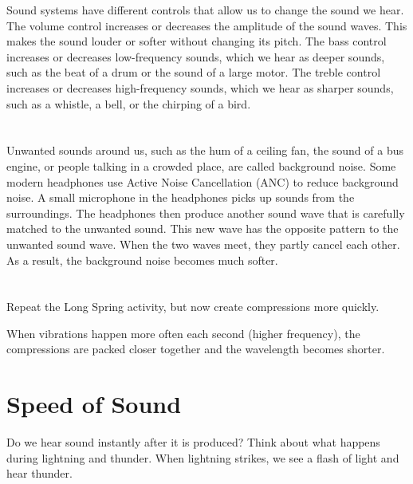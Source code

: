 \documentclass{xtufte-handout}
\begin{document}
Sound systems have different controls that allow us to change the sound we hear. The volume control increases or decreases the amplitude of the sound waves. This makes the sound louder or softer without changing its pitch. The bass control increases or decreases low-frequency sounds, which we hear as deeper sounds, such as the beat of a drum or the sound of a large motor. The treble control increases or decreases high-frequency sounds, which we hear as sharper sounds, such as a whistle, a bell, or the chirping of a bird.
\begin{marginfigure}
  \caption{Image of Volume Controls on a Sound System}
\end{marginfigure}

\section{}
Unwanted sounds around us, such as the hum of a ceiling fan, the sound of a bus engine, or people talking in a crowded place, are called background noise. Some modern headphones use Active Noise Cancellation (ANC) to reduce background noise. A small microphone in the headphones picks up sounds from the surroundings. The headphones then produce another sound wave that is carefully matched to the unwanted sound. This new wave has the opposite pattern to the unwanted sound wave. When the two waves meet, they partly cancel each other. As a result, the background noise becomes much softer.
\section{}

Repeat the Long Spring activity, but now create compressions more quickly.

 When vibrations happen more often each second (higher frequency), the compressions are packed closer together and the wavelength becomes shorter.

\section{Speed of Sound}
Do we hear sound instantly after it is produced? Think about what happens during lightning and thunder. When lightning strikes, we see a flash of light and hear thunder.
\end{document}
